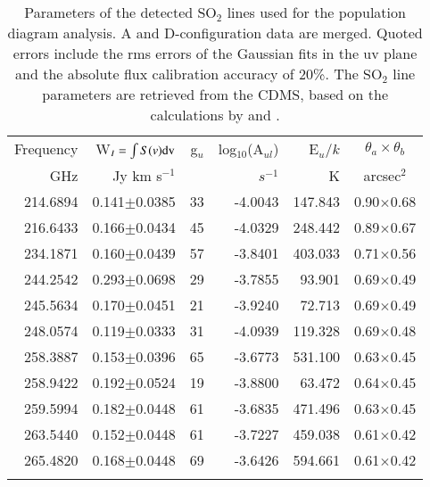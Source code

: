 \documentclass{aa}
\begin{document}
\begin{table*}
  \caption{Parameters of the detected SO$_2$ lines used for the
    population  diagram analysis. A and D-configuration data are merged. Quoted
    errors include the rms errors of the Gaussian fits in the uv plane
    and the absolute flux calibration accuracy of 20\%. The SO$_2$
    line parameters are retrieved from the CDMS, based on the calculations
    by \citet{lov1985} and \citet{mb2005}.
  }
  \begin{center}
  \begin{tabular}{rrrrrc}
\hline
\hline
Frequency & W$_I=\int S(v) {\rm dv}$ & g$_u$ & log$_{10}$(A$_{ul}$) & E$_u/k$ & $\theta_a \times \theta_b$ \\
 GHz      &  Jy km s$^{-1}$          &       &  $s^{-1}$       &    K    &  arcsec$^2$     \\    
\hline
214.6894  &  0.141$\pm$0.0385  & 33  & -4.0043   & 147.843 & 0.90$\times$0.68 \\
216.6433  &  0.166$\pm$0.0434  & 45  & -4.0329   & 248.442 & 0.89$\times$0.67 \\
234.1871  &  0.160$\pm$0.0439  & 57  & -3.8401   & 403.033 & 0.71$\times$0.56 \\
244.2542  &  0.293$\pm$0.0698  & 29  & -3.7855   &  93.901 & 0.69$\times$0.49 \\
245.5634  &  0.170$\pm$0.0451  & 21  & -3.9240   &  72.713 & 0.69$\times$0.49 \\
248.0574  &  0.119$\pm$0.0333  & 31  & -4.0939   & 119.328 & 0.69$\times$0.48 \\
258.3887  &  0.153$\pm$0.0396  & 65  & -3.6773   & 531.100 & 0.63$\times$0.45 \\
258.9422  &  0.192$\pm$0.0524  & 19  & -3.8800   &  63.472 & 0.64$\times$0.45 \\
259.5994  &  0.182$\pm$0.0448  & 61  & -3.6835   & 471.496 & 0.63$\times$0.45 \\
263.5440  &  0.152$\pm$0.0448  & 61  & -3.7227   & 459.038 & 0.61$\times$0.42 \\
265.4820  &  0.168$\pm$0.0448  & 69  & -3.6426   & 594.661 & 0.61$\times$0.42 \\
\hline
\label{so2poptab}
\end{tabular}
\end{center}
\end{table*}
\end{document}
